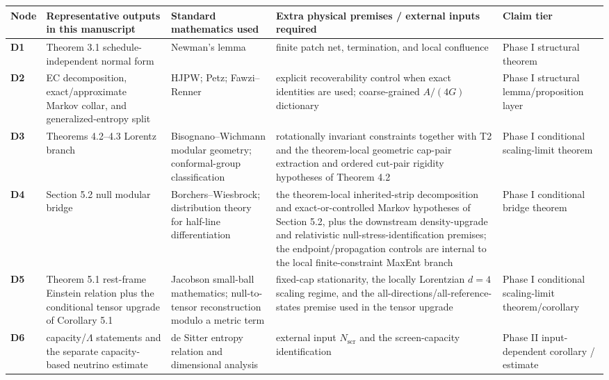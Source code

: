 \begingroup
\scriptsize
{\def\LTcaptype{none}
\setlength{\tabcolsep}{2pt}
\begin{longtable}[]{@{}>{\RaggedRight\arraybackslash}p{}>{\RaggedRight\arraybackslash}p{}>{\RaggedRight\arraybackslash}p{}>{\RaggedRight\arraybackslash}p{}>{\RaggedRight\arraybackslash}p{}@{}}
\toprule\noalign{}
Node & Representative outputs in this manuscript & Standard mathematics used & Extra physical premises / external inputs required & Claim tier \\
\midrule\noalign{}
\endhead
\bottomrule\noalign{}
\endlastfoot
\textbf{D1} & Theorem 3.1 schedule-independent normal form & Newman's lemma & finite patch net, termination, and local confluence & Phase I structural theorem \\
\textbf{D2} & EC decomposition, exact/approximate Markov collar, and generalized-entropy split & HJPW; Petz; Fawzi--Renner & explicit recoverability control when exact identities are used; coarse-grained \(A/(4G)\) dictionary & Phase I structural lemma/proposition layer \\
\textbf{D3} & Theorems 4.2--4.3 Lorentz branch & Bisognano--Wichmann modular geometry; conformal-group classification & rotationally invariant constraints together with T2 and the theorem-local geometric cap-pair extraction and ordered cut-pair rigidity hypotheses of Theorem 4.2 & Phase I conditional scaling-limit theorem \\
\textbf{D4} & Section 5.2 null modular bridge & Borchers--Wiesbrock; distribution theory for half-line differentiation & the theorem-local inherited-strip decomposition and exact-or-controlled Markov hypotheses of Section 5.2, plus the downstream density-upgrade and relativistic null-stress-identification premises; the endpoint/propagation controls are internal to the local finite-constraint MaxEnt branch & Phase I conditional bridge theorem \\
\textbf{D5} & Theorem 5.1 rest-frame Einstein relation plus the conditional tensor upgrade of Corollary 5.1 & Jacobson small-ball mathematics; null-to-tensor reconstruction modulo a metric term & fixed-cap stationarity, the locally Lorentzian \(d=4\) scaling regime, and the all-directions/all-reference-states premise used in the tensor upgrade & Phase I conditional scaling-limit theorem/corollary \\
\textbf{D6} & capacity/\(\Lambda\) statements and the separate capacity-based neutrino estimate & de Sitter entropy relation and dimensional analysis & external input \(N_{\mathrm{scr}}\) and the screen-capacity identification & Phase II input-dependent corollary / estimate \\

\end{longtable}}
